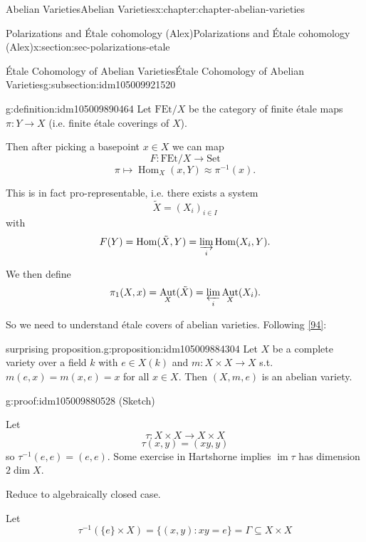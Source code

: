 \documentclass[oneside,10pt,]{book}
\numberwithin{equation}{section}
\DeclareMathOperator{\Hom}{Hom}
\DeclareMathOperator{\im}{im}
\DeclareMathOperator{\Aut}{Aut}
\begin{document}
\begin{chapterptx}{Abelian Varieties}{}{Abelian Varieties}{}{}{x:chapter:chapter-abelian-varieties}
\begin{sectionptx}{Polarizations and Étale cohomology (Alex)}{}{Polarizations and Étale cohomology (Alex)}{}{}{x:section:sec-polarizations-etale}
\begin{subsectionptx}{Étale Cohomology of Abelian Varieties}{}{Étale Cohomology of Abelian Varieties}{}{}{g:subsection:idm105009921520}
\begin{definition}{}{g:definition:idm105009890464}%
Let \(\mathrm{FEt}/X\) be the category of finite étale maps \(\pi\colon Y \to X\) (i.e. finite étale coverings of \(X\)).%
\par
Then after picking a basepoint \(x\in X\) we can map%
\begin{equation*}
F\colon \mathrm{FEt}/X\to \mathrm{Set}
\end{equation*}
%
\begin{equation*}
\pi\mapsto \Hom_X(x,Y) \approx\pi^{-1}(x)\text{.}
\end{equation*}
%
\par
This is in fact pro-representable, i.e. there exists a system%
\begin{equation*}
\tilde X = (X_i)_{i\in I}
\end{equation*}
with%
\begin{equation*}
F(Y) = \Hom(\tilde X ,Y) = \varinjlim_i \Hom(X_i, Y)\text{.}
\end{equation*}
%
\par
We then define%
\begin{equation*}
\pi_1(X,x) = \Aut_X(\tilde X) = \varprojlim_i \Aut_X(X_i)\text{.}
\end{equation*}
%
\end{definition}
So we need to understand étale covers of abelian varieties. Following \hyperlink{x:biblio:bib-vandergeer-moonen}{[94]}:%
\begin{proposition}{surprising proposition.}{}{g:proposition:idm105009884304}%
Let \(X\)  be a complete variety over a field \(k\) with \(e\in X(k)\) and \(m \colon X\times X\to X\) s.t. \(m(e,x) = m(x,e) = x\) for all \(x \in X\). Then \((X, m,e)\) is an abelian variety.%
\end{proposition}
\begin{proofptx}{}{g:proof:idm105009880528}
(Sketch)%
\par
Let%
\begin{equation*}
\tau\colon X\times X \to X\times X
\end{equation*}
%
\begin{equation*}
\tau(x,y) = (xy,y)
\end{equation*}
so \(\tau^{-1} (e,e) = (e,e)\). Some exercise in Hartshorne implies \(\im \tau\) has dimension \(2\dim X\).%
\par
Reduce to algebraically closed case.%
\par
Let%
\begin{equation*}
\tau^{-1}(\{e\} \times X) =  \{(x,y) : xy = e\} = \Gamma \subseteq X\times X

\end{equation*}
\end{proofptx}
\end{subsectionptx}
\end{sectionptx}
\end{chapterptx}
\end{document}
